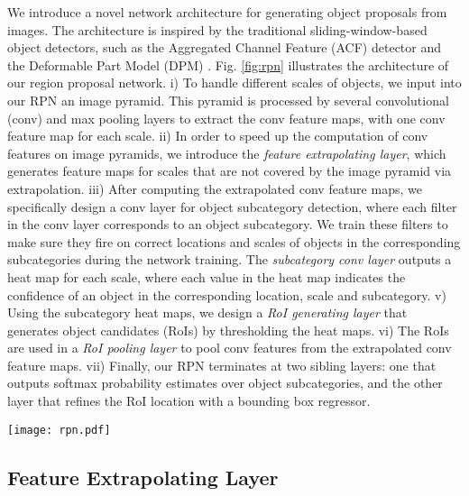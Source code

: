 \documentclass[10pt,twocolumn,letterpaper]{article}
\begin{document}
We introduce a novel network architecture for generating object proposals from images. The architecture is inspired by the traditional sliding-window-based object detectors, such as the Aggregated Channel Feature (ACF) detector \cite{DollarPAMI14pyramids} and the Deformable Part Model (DPM) \cite{felzenszwalb2010object}. Fig. \ref{fig:rpn} illustrates the architecture of our region proposal network. i) To handle different scales of objects, we input into our RPN an image pyramid. This pyramid is processed by several convolutional (conv) and max pooling layers to extract the conv feature maps, with one conv feature map for each scale. ii) In order to speed up the computation of conv features on image pyramids, we introduce the \emph{feature extrapolating layer}, which generates feature maps for scales that are not covered by the image pyramid via extrapolation. iii) After computing the extrapolated conv feature maps, we specifically design a conv layer for object subcategory detection, where each filter in the conv layer corresponds to an object subcategory. We train these filters to make sure they fire on correct locations and scales of objects in the corresponding subcategories during the network training. The \emph{subcategory conv layer} outputs a heat map for each scale, where each value in the heat map indicates the confidence of an object in the corresponding location, scale and subcategory. v) Using the subcategory heat maps, we design a \emph{RoI generating layer} that generates object candidates (RoIs) by thresholding the heat maps. vi) The RoIs are used in a \emph{RoI pooling layer} \cite{girshick2015fast} to pool conv features from the extrapolated conv feature maps. vii) Finally, our RPN terminates at two sibling layers: one that outputs softmax probability estimates over object subcategories, and the other layer that refines the RoI location with a bounding box regressor.

\begin{figure*} \small
	\centering
	\texttt{[image: rpn.pdf]}
	\caption{Architecture of our region proposal network. Red arrows indicate the route of derivatives in back-propagation training.}
	\label{fig:rpn}
	\vspace{-4mm}
\end{figure*}

\subsection{Feature Extrapolating Layer}
\end{document}
